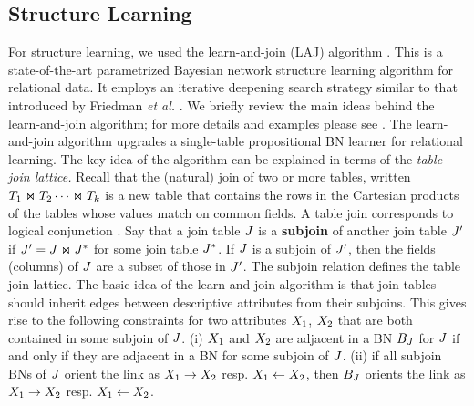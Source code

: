 \documentclass[runningheads,a4paper]{llncs}
\begin{document}
\subsection{Structure Learning} For structure learning, we used the learn-and-join (LAJ) algorithm \cite{Khosravi2010}. This is a state-of-the-art parametrized Bayesian network structure learning algorithm for relational data. It employs an iterative deepening search strategy similar to that introduced by Friedman {\em et al.} \cite{Friedman99prm}. 
We briefly review the main ideas behind the learn-and-join algorithm; for more details and examples please see \cite{Schulte2012}. 
The learn-and-join algorithm upgrades a single-table propositional BN learner for relational learning. The key idea of the algorithm can be explained in terms of the {\em table join lattice.} Recall that the (natural) join of two or more tables, written $T_{1} \Join T_{2} \cdots \Join T_{k}$ is a new table that contains the rows in the Cartesian products of the tables whose values match on common fields. A table join corresponds to logical conjunction \cite{Ullman1982}.
Say that a join table $J$ is a \textbf{subjoin} of another join table $J'$
if $J' = J \Join J^{*}$ for some join table $J^{*}$. If $J$ is a subjoin of $J'$, then the fields (columns) of $J$ are a subset of those in $J'$. The subjoin relation defines the table join lattice. The basic idea of the learn-and-join algorithm is that join tables should inherit edges between descriptive attributes from their subjoins. This gives rise to the following constraints for two attributes $X_{1}$, $X_{2}$ that are both contained in some subjoin of $J$. (i) $X_{1}$ and $X_{2}$ are adjacent in a BN $B_{J}$ for $J$ if and only if they are adjacent in a BN for some subjoin of $J$. (ii) if all subjoin BNs of $J$ orient the link as $X_{1}\rightarrow X_{2}$ resp. $X_{1}\leftarrow X_{2}$, then $B_{J}$ orients the link as $X_{1}\rightarrow X_{2}$ resp. $X_{1}\leftarrow X_{2}$.
\end{document}
